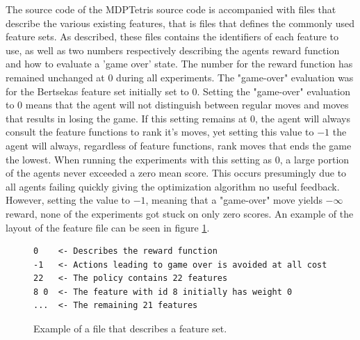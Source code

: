 The source code of the MDPTetris source code 
is accompanied with files that describe the
various existing features, that is files that defines 
the commonly used feature sets. As described, these files contains the identifiers of 
each feature to use, as well as two numbers respectively describing 
the agents reward function and how to evaluate a 'game over' state. 
The number for the reward function has remained unchanged at $0$ 
during all experiments. The "game-over" evaluation was for the
Bertsekas feature set initially set to $0$. Setting the 
"game-over" evaluation to $0$ means that the agent will not 
distinguish between regular moves and moves that results in losing
the game. If this setting remains at 0, the agent will always consult the
feature functions to rank it's moves, yet setting this value to $-1$
the agent will always, regardless of feature functions, rank moves that ends
the game the lowest.
When running the experiments with this setting as $0$, a large portion
of the agents never exceeded a zero mean score. This occurs presumingly 
due to all agents failing quickly giving the optimization algorithm no 
useful feedback. However, setting the value
to $-1$, meaning that a "game-over" move yields $-\infty$ reward, 
none of the experiments got stuck on only zero scores. An example
of the layout of the feature file can be seen in figure \ref{fig:featfile}.
\begin{figure}[H]
\centering
\begin{lstlisting}
0    <- Describes the reward function
-1   <- Actions leading to game over is avoided at all cost
22   <- The policy contains 22 features
8 0  <- The feature with id 8 initially has weight 0
...  <- The remaining 21 features
\end{lstlisting}
\caption{Example of a file that describes a feature set. \label{fig:featfile}}
\end{figure}

